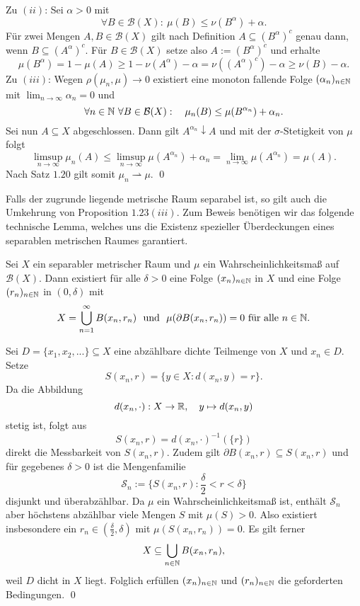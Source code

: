 \begin{proof*}
$$    $$
    Zu $(ii)$: Sei $\alpha > 0$ mit 
    $$
        \forall B \in \mathcal{B}(X): \ \mu(B) \leq \nu(B^{\alpha}) + \alpha.
    $$
    Für zwei Mengen $A,B \in \mathcal{B}(X)$ gilt nach Definition $A \subseteq (B^{\alpha})^c$ genau dann, wenn $B \subseteq (A^{\alpha})^c$. 
    Für $B \in \mathcal{B}(X)$ setze also $A:=(B^{\alpha})^c$ und erhalte 
    $$ 
        \mu(B^{\alpha}) = 1 - \mu(A) \geq 1 - \nu(A^{\alpha}) - \alpha = \nu((A^{\alpha})^c) - \alpha \geq \nu(B) - \alpha. 
    $$
    Zu $(iii)$: Wegen $\rho(\mu_n, \mu) \to 0$ existiert eine monoton fallende Folge $(\alpha_n)_{n \in \mathbb{N}}$ mit $\lim_{n \to \infty}\alpha_n = 0$ und 
    $$
        \forall n \in \mathbb{N} \ \forall B \in \mathcal{B}(X): \quad \mu_n(B) \leq \mu(B^{\alpha_n}) + \alpha_n. 
    $$
    Sei nun $A \subseteq X$ abgeschlossen. Dann gilt $A^{\alpha_n} \downarrow A$ und mit der $\sigma$-Stetigkeit von $\mu$ folgt
    $$
        \limsup_{n \to \infty} \mu_n(A) \leq \limsup_{n \to \infty} \mu(A^{\alpha_n}) + \alpha_n = \lim_{n \to \infty} \mu(A^{\alpha_n}) = \mu(A). 
    $$
    Nach Satz $1.20$ gilt somit $\mu_n \rightharpoonup \mu$. 
    \qed
\end{proof*}
Falls der zugrunde liegende metrische Raum separabel ist, so gilt auch die Umkehrung von Proposition $1.23(iii)$. 
Zum Beweis benötigen wir das folgende technische Lemma, welches uns die Existenz spezieller Überdeckungen eines separablen metrischen Raumes garantiert. 
\begin{lemma}
    Sei $X$ ein separabler metrischer Raum und $\mu$ ein Wahrscheinlichkeitsmaß auf $\mathcal{B}(X)$. Dann existiert für alle $\delta > 0$ eine Folge $(x_n)_{n \in \mathbb{N}}$ in $X$ und eine Folge $(r_n)_{n \in \mathbb{N}}$ in $(0, \delta)$ mit 
         $$
         X = \bigcup_{n=1}^{\infty}B(x_n, r_n) \ \text{ und } \ \mu(\partial B(x_n, r_n)) = 0 \text{ für alle }n \in \N.
         $$  
\end{lemma}
\begin{proof*}%
    Sei $D = \{x_1, x_2,... \} \subseteq X$ eine abzählbare dichte Teilmenge von $X$ und $x_n \in D$. Setze 
    $$
        S(x_n,r) = \{y \in X: d(x_n,y) = r\}.
    $$
    Da die Abbildung 
    $$
        d(x_n, \cdot): X \to \mathbb{R}, \quad y \mapsto d(x_n,y)
    $$
    stetig ist, folgt aus 
    $$
        S(x_n, r) = d(x_n, \cdot)^{-1}(\{r\})
    $$
    direkt die Messbarkeit von $S(x_n, r)$. 
    Zudem gilt $\partial B(x_n,r) \subseteq S(x_n,r)$ und für gegebenes $\delta > 0$ ist die Mengenfamilie
    $$
        \mathcal{S}_n := \{S(x_n,r) : \frac{\delta}{2} < r < \delta \}
    $$
    disjunkt und überabzählbar. Da $\mu$ ein Wahrscheinlichkeitsmaß ist, enthält $\mathcal{S}_n$ aber höchstens abzählbar viele Mengen $S$ mit $\mu(S) > 0$. 
    Also existiert insbesondere ein $r_n \in (\frac{\delta}{2}, \delta)$ mit \mbox{$\mu(S(x_n,r_n)) = 0$}. Es gilt ferner
    $$
        X \subseteq \bigcup_{n \in  \mathbb{N}}B(x_n, r_n),
    $$
    weil $D$ dicht in $X$ liegt. Folglich erfüllen $(x_n)_{n \in \mathbb{N}}$ und $(r_n)_{n \in \mathbb{N}}$ die geforderten Bedingungen. \qed
\end{proof*}


